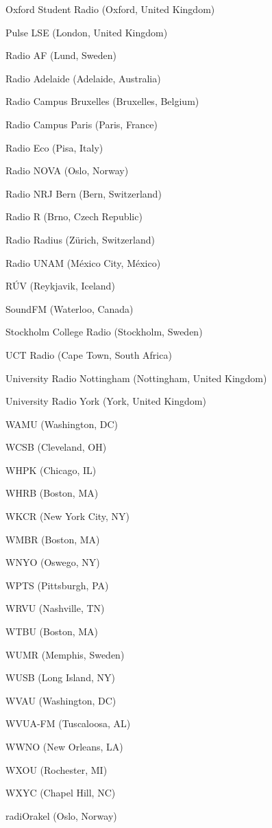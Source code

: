 \documentclass[20pt,landscape]{foils}
\begin{document}
\begin{list1}
\begin{list2}
  \item Oxford Student Radio (Oxford, United Kingdom)
  \item Pulse LSE (London, United Kingdom)
  \item Radio AF (Lund, Sweden)
  \item Radio Adelaide (Adelaide, Australia)
  \item Radio Campus Bruxelles (Bruxelles, Belgium)
  \item Radio Campus Paris (Paris, France)
  \item Radio Eco (Pisa, Italy)
  \item Radio NOVA (Oslo, Norway)
  \item Radio NRJ Bern (Bern, Switzerland)
  \item Radio R (Brno, Czech Republic)
  \item Radio Radius (Zürich, Switzerland)
  \item Radio UNAM (México City, México)
  \item RÚV (Reykjavik, Iceland)
  \item SoundFM (Waterloo, Canada)
  \item Stockholm College Radio (Stockholm, Sweden)
  \item UCT Radio (Cape Town, South Africa)
  \item University Radio Nottingham (Nottingham, United Kingdom)
  \item University Radio York (York, United Kingdom)
  \item WAMU (Washington, DC)
  \item WCSB (Cleveland, OH)
  \item WHPK (Chicago, IL)
  \item WHRB (Boston, MA)
  \item WKCR (New York City, NY)
  \item WMBR (Boston, MA) 
  \item WNYO (Oswego, NY)
  \item WPTS (Pittsburgh, PA)
  \item WRVU (Nashville, TN)
  \item WTBU (Boston, MA)
  \item WUMR (Memphis, Sweden)
  \item WUSB (Long Island, NY)
  \item WVAU (Washington, DC)
  \item WVUA-FM (Tuscaloosa, AL)
  \item WWNO (New Orleans, LA)
  \item WXOU (Rochester, MI)
  \item WXYC (Chapel Hill, NC)
  \item radiOrakel (Oslo, Norway)
  \end{list2}
\end{list1}
\end{document}
